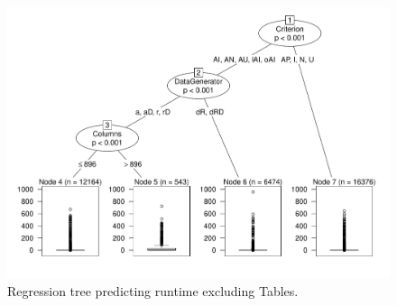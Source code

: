 \begin{figure}
\centering
  \centering
  \includegraphics[width=.75\linewidth]{diagrams/NoTableCtreesd.pdf}
  \caption{Regression tree predicting runtime excluding Tables.\vspace{-.15in}}
  \label{fig:ttree}
  \vspace{-.15in}
\end{figure}
